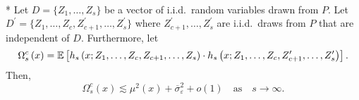 \begin{boxD}
    \begin{lem}\label{lem:omega_sc}\mbox{}\\*
	Let $D = \{Z_1, \dotsc, Z_{s}\}$ be a vector of i.i.d.\ random variables drawn from $P$.
	Let $D^{\prime} = \{Z_1, \dotsc, Z_{c}, Z_{c+1}^{\prime}, \dotsc,  Z_{s}^{\prime}\}$ where $Z_{c+1}^{\prime}, \dotsc,  Z_{s}^{\prime}$ are i.i.d.\ draws from $P$ that are independent of $D$.
	Furthermore, let
	\begin{equation}
		\Omega_{s}^{c}\left(x\right)
		= \mathbb{E}\left[h_{s}\left(x; Z_1, \ldots, Z_{c}, Z_{c+1}, \ldots, Z_{s}\right) \cdot
			h_{s}\left(x; Z_1, \ldots,Z_{c}, Z_{c+1}^{\prime}, \ldots, Z_{s}^{\prime}\right)\right].
	\end{equation}
	Then,
	\begin{equation}
		\Omega_{s}^{c}\left(x\right)
		\lesssim \mu^2(x) + \overline{\sigma}_{\varepsilon}^2 + o(1)
		\quad \text{as} \quad s \rightarrow \infty.
	\end{equation}
\end{lem}
\end{boxD}

